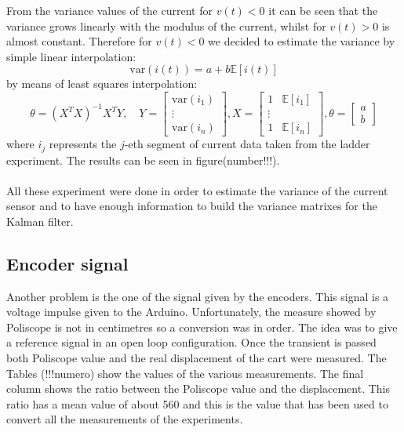 From the variance values of the current for $v(t)<0$ it can be seen that the variance grows linearly with the modulus of the current, whilst for $v(t)>0$ is almost constant. Therefore for $v(t)<0$ we decided to estimate the variance by simple linear interpolation:
\begin{equation}
\text{var}(i(t)) = a + b \mathbb{E}[i(t)]
\end{equation}
by means of least squares interpolation:
\begin{equation}
\theta = (X^T X)^{-1} X^T Y, \quad
Y  = \begin{bmatrix} \text{var}(i_1)\\ \vdots \\ \text{var}(i_n) \end{bmatrix},
X = \begin{bmatrix} 1 & \mathbb{E}[i_1]\\ \vdots \\ 1 & \mathbb{E}[i_n] \end{bmatrix},
\theta = \begin{bmatrix} a\\ b\end{bmatrix}
\end{equation}
where $i_j$ represents the $j$-eth segment of current data taken from the ladder experiment.
 The results can be seen in figure(number!!!).\\ \\
All these experiment were done in order to estimate the variance of the current sensor and to have enough information to build the variance matrixes for the Kalman filter.
\subsection{Encoder signal}
Another problem is the one of the signal given by the encoders. This signal is a voltage impulse given to the Arduino. Unfortunately, the measure showed by Poliscope is not in centimetres so a conversion was in order. The idea was to give a reference signal in an open loop configuration. Once the transient is passed both Poliscope value and the real displacement of the cart were measured. The Tables (!!!numero) show the values of the various measurements. The final column shows the ratio between the Poliscope value and the displacement. This ratio has a mean value of about 560 and this is the value that has been used to convert all the measurements of the experiments.
